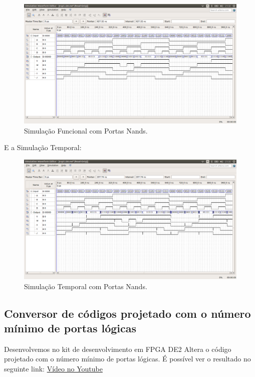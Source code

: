 \documentclass[12pt]{article}
\begin{document}
\begin{figure}[H]
	\centering
	\includegraphics[width=1\textwidth]{funcional2.png}
	\caption{Simulação Funcional com Portas Nands.}
	\label{fig:funcional2}
\end{figure}
E a Simulação Temporal:

\begin{figure}[H]
	\centering
	\includegraphics[width=1\textwidth]{temporal2.png}
	\caption{Simulação Temporal com Portas Nands.}
	\label{fig:temporal2}
\end{figure}




\subsection{Conversor de códigos projetado com o número mínimo de portas lógicas}
\label{sec:conversor}

Desenvolvemos no kit de desenvolvimento em FPGA DE2 Altera o código projetado com o número mínimo de portas lógicas. É possível ver o resultado no seguinte link: \href{https://www.youtube.com/watch?v=1CFXa6bdLcs}{Vídeo no Youtube}
\end{document}
